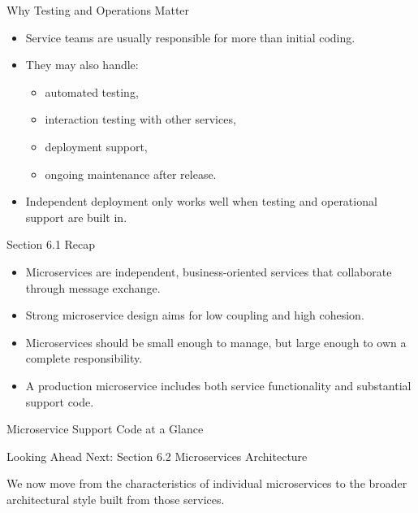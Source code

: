 \begin{frame}{Why Testing and Operations Matter}
\begin{itemize}
    \item Service teams are usually responsible for more than initial coding.
    \item They may also handle:
    \begin{itemize}
        \item automated testing,
        \item interaction testing with other services,
        \item deployment support,
        \item ongoing maintenance after release.
    \end{itemize}
    \item Independent deployment only works well when testing and operational support are built in.
\end{itemize}
\end{frame}

\begin{frame}{Section 6.1 Recap}
\begin{itemize}
    \item Microservices are independent, business-oriented services that collaborate through message exchange.
    \item Strong microservice design aims for low coupling and high cohesion.
    \item Microservices should be small enough to manage, but large enough to own a complete responsibility.
    \item A production microservice includes both service functionality and substantial support code.
\end{itemize}
\end{frame}


\begin{frame}{Microservice Support Code at a Glance}
\centering
{}
\end{frame}



\begin{frame}{Looking Ahead}
\centering
\Large Next: Section 6.2 Microservices Architecture

\vspace{1em}

\normalsize
We now move from the characteristics of individual microservices to the broader architectural style built from those services.
\end{frame}
